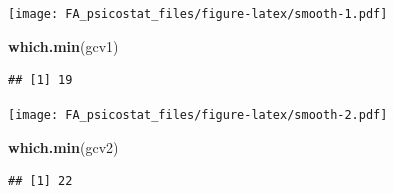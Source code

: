 \documentclass[]{article}
\newenvironment{Shaded}{\begin{snugshade}}{\end{snugshade}}
\newcommand{\ControlFlowTok}[1]{\textcolor[rgb]{0.13,0.29,0.53}{\textbf{#1}}}
\newcommand{\DataTypeTok}[1]{\textcolor[rgb]{0.13,0.29,0.53}{#1}}
\newcommand{\DecValTok}[1]{\textcolor[rgb]{0.00,0.00,0.81}{#1}}
\newcommand{\KeywordTok}[1]{\textcolor[rgb]{0.13,0.29,0.53}{\textbf{#1}}}
\newcommand{\NormalTok}[1]{#1}
\newcommand{\OperatorTok}[1]{\textcolor[rgb]{0.81,0.36,0.00}{\textbf{#1}}}
\newcommand{\OtherTok}[1]{\textcolor[rgb]{0.56,0.35,0.01}{#1}}
\newcommand{\StringTok}[1]{\textcolor[rgb]{0.31,0.60,0.02}{#1}}
\begin{document}
\texttt{[image: FA\_psicostat\_files/figure-latex/smooth-1.pdf]}

\begin{Shaded}
\begin{Highlighting}[]
\KeywordTok{which.min}\NormalTok{(gcv1)}
\end{Highlighting}
\end{Shaded}

\begin{verbatim}
## [1] 19
\end{verbatim}

\begin{Shaded}
\end{Shaded}

\texttt{[image: FA\_psicostat\_files/figure-latex/smooth-2.pdf]}

\begin{Shaded}
\begin{Highlighting}[]
\KeywordTok{which.min}\NormalTok{(gcv2)}
\end{Highlighting}
\end{Shaded}

\begin{verbatim}
## [1] 22
\end{verbatim}
\end{document}

